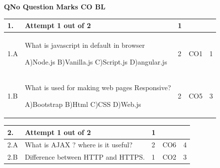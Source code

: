 \documentclass[12pt]{article}
\begin{document}
	\begin{flushleft}
	\bf{QNo}\hspace{1.2cm} \bf{Question} \hspace{5.5cm}  \bf{Marks} \hspace{0.2cm} \bf{CO} \hspace{0.2cm}	\bf{BL}	
	
\end{flushleft} 
	\begin{tabular}{|L{1cm}|L{8cm}|C{1cm}|C{1cm}|C{1cm}|}\hline
		\bf{1}. & \bf{Attempt} \bf1 \bf{out} of \bf2 & \bf1  & & \\ \hline
				1.A & What is javascript in default in browser \newline
					
		A)Node.js\newline
		B)Vanilla.js\newline
		C)Script.js\newline
		D)angular.js &
		2 &
		CO1&
		1 \\ \hline
		
				1.B & What is used for making web pages Responsive? \newline
					
		A)Bootstrap\newline
		B)Html\newline
		C)CSS\newline
		D)Web.js &
		2 &
		CO5&
		3 \\ \hline
		
		
	\end{tabular}

	\begin{tabular}{|L{1cm}|L{8cm}|C{1cm}|C{1cm}|C{1cm}|}
	\bf2. & \bf{Attempt} \bf{1} \bf{out of} \bf{2} & \bf{1}  & & \\ \hline





		2.A &
	What is AJAX ? where is it useful? \newline
			
	 &  2 & CO6 & 4\\ \hline
		2.B &
	Difference between HTTP and HTTPS. \newline
			
	 &  1 & CO2 & 3\\ \hline
	\end{tabular}
\end{document}
